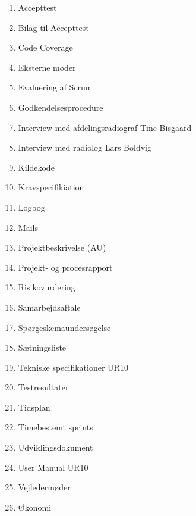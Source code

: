 \begin{enumerate}
\item Accepttest 					 		\label{Accepttest}
\item Bilag til Accepttest						\label{BilagAccepttest}
\item Code Coverage 						\label{Code Coverage}
\item Eksterne møder						\label{Eksterne moder} 
\item Evaluering af Scrum 						\label{Evaluering Scrum} 
\item Godkendelsesprocedure 					\label{Godkendelsesprocedure}
\item Interview med afdelingsradiograf Tine Bisgaard 	\label{Tine}
\item Interview med radiolog Lars Boldvig  			\label{Telefoninterview}
\item Kildekode							\label{Kildekode} 
\item Kravspecifikiation 						\label{Kravspecifikation}
\item Logbog								\label{Logbog}
\item Mails								\label{Mails}
\item Projektbeskrivelse (AU) 					\label{Projektbeskrivelse}
\item Projekt- og procesrapport 					
\item Risikovurdering 						\label{Risikovurdering} 
\item Samarbejdsaftale						\label{Samarbejdesaftale} 
\item Spørgeskemaundersøgelse 					\label{Sporgeskemaundersogelse}
\item Sætningsliste 							\label{Satningsliste}
\item Tekniske specifikationer UR10				\label{UR10spec}
\item Testresultater 						\label{TestResultater}
\item Tidsplan							\label{Tidsplan}
\item Timebestemt sprints 						\label{Timebestemt sprints}
\item Udviklingsdokument 						\label{Udviklingsdokument}
\item User Manual UR10 						\label{UserManualUR10}
\item Vejledermøder						\label{Vejledermoder}
\item Økonomi 							\label{Okonomi}
\end{enumerate}

